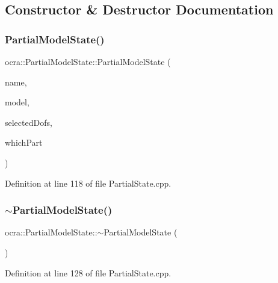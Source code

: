 \subsection{Constructor \& Destructor Documentation}
\hypertarget{classocra_1_1PartialModelState_aad632d12d35f5982df12d949f92d4937}{}\label{classocra_1_1PartialModelState_aad632d12d35f5982df12d949f92d4937} 
\subsubsection{\texorpdfstring{Partial\+Model\+State()}{PartialModelState()}}
{\footnotesize\ttfamily ocra\+::\+Partial\+Model\+State\+::\+Partial\+Model\+State (\begin{DoxyParamCaption}\item[{const std\+::string \&}]{name,  }\item[{const Model \&}]{model,  }\item[{const Eigen\+::\+Vector\+Xi \&}]{selected\+Dofs,  }\item[{int}]{which\+Part }\end{DoxyParamCaption})}



Definition at line 118 of file Partial\+State.\+cpp.

\hypertarget{classocra_1_1PartialModelState_a59cf8faac5922dc7691c540d519fa705}{}\label{classocra_1_1PartialModelState_a59cf8faac5922dc7691c540d519fa705} 
\subsubsection{\texorpdfstring{$\sim$\+Partial\+Model\+State()}{~PartialModelState()}}
{\footnotesize\ttfamily ocra\+::\+Partial\+Model\+State\+::$\sim$\+Partial\+Model\+State (\begin{DoxyParamCaption}{ }\end{DoxyParamCaption})\hspace{0.3cm}{\ttfamily [virtual]}}



Definition at line 128 of file Partial\+State.\+cpp.



